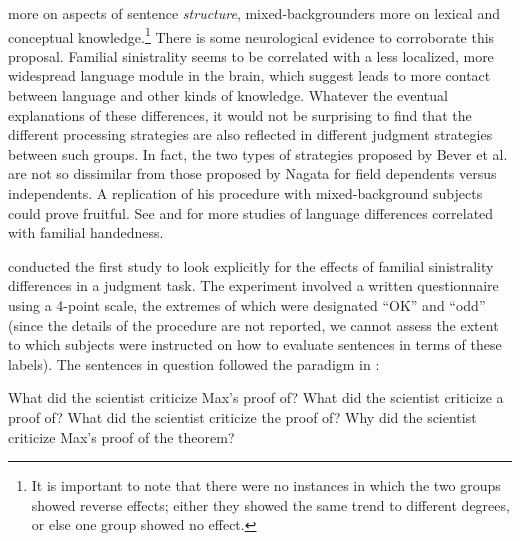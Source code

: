 more on aspects of sentence \textit{structure}, mixed-backgrounders more on lexical and conceptual knowledge.\footnote{It is important to note that there were no instances in which the two groups showed reverse effects; either they showed the same trend to different degrees, or else one group showed no effect.}
 There is some neurological evidence to corroborate this proposal. Familial sinistrality seems to be correlated with a less localized, more widespread language module in the brain, which \citet{BeverEtAl1987} suggest leads to more contact between language and other kinds of knowledge. Whatever the eventual explanations of these differences, it would not be surprising to find that the different processing strategies are also reflected in different judgment strategies between such groups. In fact, the two types of strategies proposed by Bever et al. are not so dissimilar from those proposed by Nagata for field dependents versus independents. A replication of his procedure with mixed-background subjects could prove fruitful. See \citet{BeverEtAl1989} and \citet{Bever1992} for more studies of language differences correlated with familial handedness.

\citet{Cowart1989} conducted the first study to look explicitly for the effects of familial sinistrality differences in a judgment task. The experiment involved a written questionnaire using a 4-point scale, the extremes of which were designated ``OK'' and ``odd'' (since the details of the procedure are not reported, we cannot assess the extent to which subjects were instructed on how to evaluate sentences in terms of these labels). The sentences in question followed the paradigm in :


\ea\label{ex:4:4}
\ea What did the scientist criticize Max's proof of? 
\ex What did the scientist criticize a proof of?
\ex What did the scientist criticize the proof of?
\ex Why did the scientist criticize Max's proof of the theorem?
\z
\z
   
